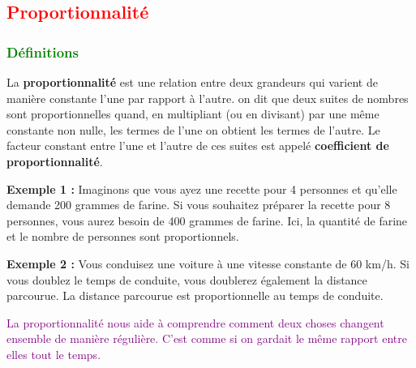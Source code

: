\documentclass{article}
\begin{document}
\subsection{\textcolor{red}{Proportionnalité}}

\subsubsection{\textcolor{green}{Définitions}}

\begin{tcolorbox}[colback=red!10!white, colframe=red!75!black, title=\textcolor{white}{Définition}, 
                  sharp corners=southwest]
    La \textbf{proportionnalité} est une relation entre deux grandeurs qui varient de manière constante l'une par rapport à l'autre. on dit que deux suites de nombres sont proportionnelles quand, en multipliant (ou en divisant) par une même constante non nulle, les termes de l'une on obtient les termes de l'autre. Le facteur constant entre l'une et l'autre de ces suites est appelé \textbf{coefficient de proportionnalité}.
\end{tcolorbox}

\vspace{0.2cm}

\begin{tcolorbox}[colback=orange!10!white, colframe=orange!75!black, title=\textcolor{white}{Exemples}, 
                  sharp corners=south]
    \textbf{Exemple 1 :} Imaginons que vous ayez une recette pour 4 personnes et qu'elle demande 200 grammes de farine. Si vous souhaitez préparer la recette pour 8 personnes, vous aurez besoin de 400 grammes de farine. Ici, la quantité de farine et le nombre de personnes sont proportionnels.

    \vspace{0.2cm}

    \textbf{Exemple 2 :} Vous conduisez une voiture à une vitesse constante de 60 km/h. Si vous doublez le temps de conduite, vous doublerez également la distance parcourue. La distance parcourue est proportionnelle au temps de conduite.
\end{tcolorbox}

\vspace{0.2cm}

\begin{tcolorbox}[colback=purple!10!white, colframe=purple!75!black, title=\textcolor{white}{Note}, 
                  sharp corners=south]
    \textcolor{purple}{La proportionnalité nous aide à comprendre comment deux choses changent ensemble de manière régulière. C'est comme si on gardait le même rapport entre elles tout le temps.}
\end{tcolorbox}
\end{document}
